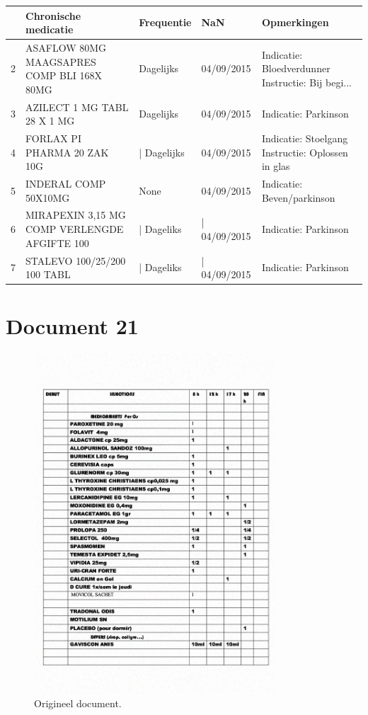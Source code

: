 \begin{tabular}{lllll}
\toprule
{} &                          Chronische medicatie &   Frequentie &           NaN &                                        Opmerkingen \\
\midrule
2 &    ASAFLOW 80MG MAAGSAPRES COMP BLI 168X 80MG &    Dagelijks &    04/09/2015 &  Indicatie: Bloedverdunner Instructie: Bij begi... \\
3 &                   AZILECT 1 MG TABL 28 X 1 MG &    Dagelijks &    04/09/2015 &                               Indicatie: Parkinson \\
4 &                   FORLAX PI PHARMA 20 ZAK 10G &  | Dagelijks &    04/09/2015 &  Indicatie: Stoelgang Instructie: Oplossen in glas \\
5 &                          INDERAL COMP 50X10MG &         None &    04/09/2015 &                         Indicatie: Beven/parkinson \\
6 &  MIRAPEXIN 3,15 MG COMP VERLENGDE AFGIFTE 100 &   | Dageliks &  | 04/09/2015 &                               Indicatie: Parkinson \\
7 &                   STALEVO 100/25/200 100 TABL &   | Dageliks &  | 04/09/2015 &                               Indicatie: Parkinson \\
\bottomrule
\end{tabular}
\section{Document 21}

\begin{figure}[H]
    \centering
    \includegraphics[width=0.8\textwidth]{test-resultaten/21/original.png}
    \caption{Origineel document.}
\end{figure}

